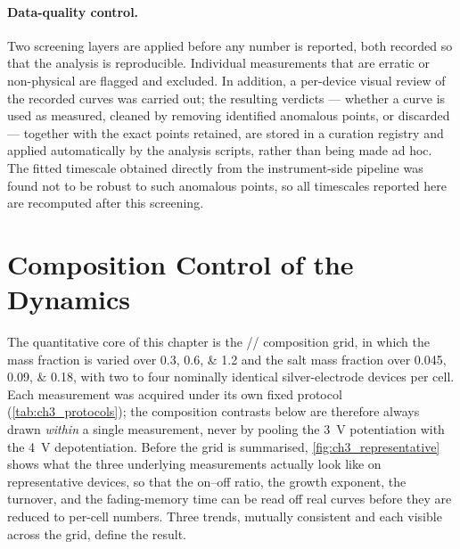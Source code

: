 \documentclass[12pt, twoside]{report}
\begin{document}
\paragraph{Data-quality control.} Two screening layers are applied before any number is reported, both recorded so that the analysis is reproducible. Individual measurements that are erratic or non-physical are flagged and excluded. In addition, a per-device visual review of the recorded curves was carried out; the resulting verdicts --- whether a curve is used as measured, cleaned by removing identified anomalous points, or discarded --- together with the exact points retained, are stored in a curation registry and applied automatically by the analysis scripts, rather than being made ad hoc. The fitted timescale obtained directly from the instrument-side pipeline was found not to be robust to such anomalous points, so all timescales reported here are recomputed after this screening.

\section{Composition Control of the Dynamics}\label{sec:ch3_composition}

The quantitative core of this chapter is the \SY{}/\PEO{}/\LiTf{} composition grid, in which the \PEO{} mass fraction is varied over \numlist{0.3;0.6;1.2} and the salt mass fraction over \numlist{0.045;0.09;0.18}, with two to four nominally identical silver-electrode devices per cell. Each measurement was acquired under its own fixed protocol (\cref{tab:ch3_protocols}); the composition contrasts below are therefore always drawn \emph{within} a single measurement, never by pooling the \SI{3}{\volt} potentiation with the \SI{4}{\volt} depotentiation. Before the grid is summarised, \cref{fig:ch3_representative} shows what the three underlying measurements actually look like on representative devices, so that the on--off ratio, the growth exponent, the turnover, and the fading-memory time can be read off real curves before they are reduced to per-cell numbers. Three trends, mutually consistent and each visible across the grid, define the result.
\end{document}
